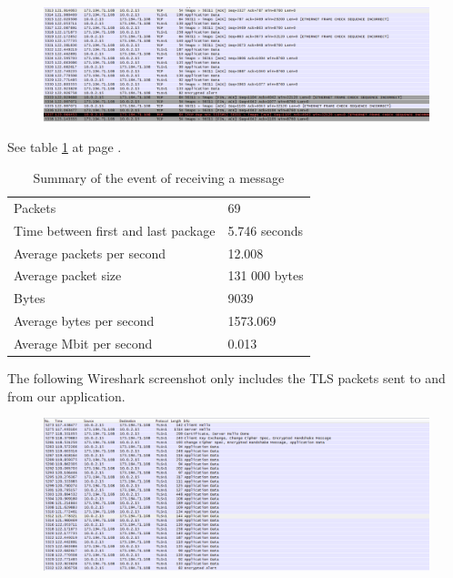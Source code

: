 \begin{figure}[h!]
\begin{center}
\includegraphics{ws2}
\end{center}
\end{figure}

See table \ref{tab:summaryrecmes} at page \pageref{tab:summaryrecmes}.
\begin{table}
\begin{tabular}{ll} \hline
Packets & 69 \\
Time between first and last package & 5.746 seconds \\
Average packets per second & 12.008 \\
Average packet size & 131 000 bytes \\
Bytes & 9039 \\
Average bytes per second & 1573.069 \\
Average Mbit per second & 0.013 \\ \hline
\end{tabular}
\caption{Summary of the event of receiving a message} \label{tab:summaryrecmes}
\end{table}

The following Wireshark screenshot only includes the TLS packets sent to and from our application.

\begin{figure}[h!]
\begin{center}
\includegraphics{ws3}
\end{center}
\end{figure}

